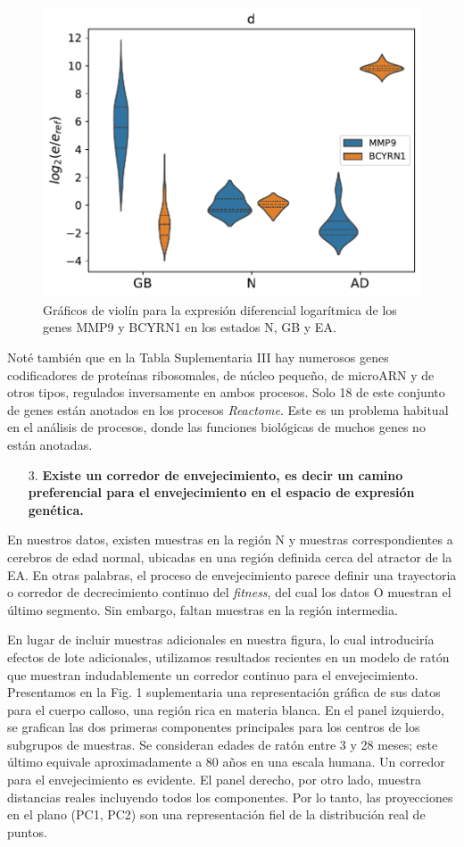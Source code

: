 \begin{figure}[!htb]
	\centering
	\includegraphics[width=0.75\linewidth]{figures/Fig_1d.pdf}
	\caption{Gráficos de violín para la expresión diferencial logarítmica de los genes MMP9 y BCYRN1 en los estados N, GB y EA.}
	\label{fig:fig1d}
\end{figure}

Noté también que en la \alert{Tabla Suplementaria III} hay numerosos genes codificadores de proteínas ribosomales, de núcleo pequeño, de microARN y de otros tipos, regulados inversamente en ambos procesos. Solo 18 de este conjunto de genes están anotados en los procesos \textit{Reactome}. Este es un problema habitual en el análisis de procesos, donde las funciones biológicas de muchos genes no están anotadas.

\begin{enumerate}
	\item[3.] \textbf{Existe un corredor de envejecimiento, es decir un camino preferencial para el envejecimiento en el espacio de expresión genética.}
\end{enumerate}

En nuestros datos, existen muestras en la región N y muestras correspondientes a cerebros de edad normal, ubicadas en una región definida cerca del atractor de la EA. En otras palabras, el proceso de envejecimiento parece definir una trayectoria o corredor de decrecimiento continuo del \textit{fitness}, del cual los datos O muestran el último segmento. Sin embargo, faltan muestras en la región intermedia.

En lugar de incluir muestras adicionales en nuestra figura, lo cual introduciría efectos de lote adicionales, utilizamos resultados recientes en un modelo de ratón \cite{hahn2023atlas} que muestran indudablemente un corredor continuo para el envejecimiento. Presentamos en la \alert{Fig. 1 suplementaria} una representación gráfica de sus datos para el cuerpo calloso, una región rica en materia blanca. \alert{En el panel izquierdo}, se grafican las dos primeras componentes principales para los centros de los subgrupos de muestras. Se consideran edades de ratón entre 3 y 28 meses; este último equivale aproximadamente a 80 años en una escala humana. Un corredor para el envejecimiento es evidente. \alert{El panel derecho}, por otro lado, muestra distancias reales incluyendo todos los componentes. Por lo tanto, las proyecciones en el plano (PC1, PC2) son una representación fiel de la distribución real de puntos.

